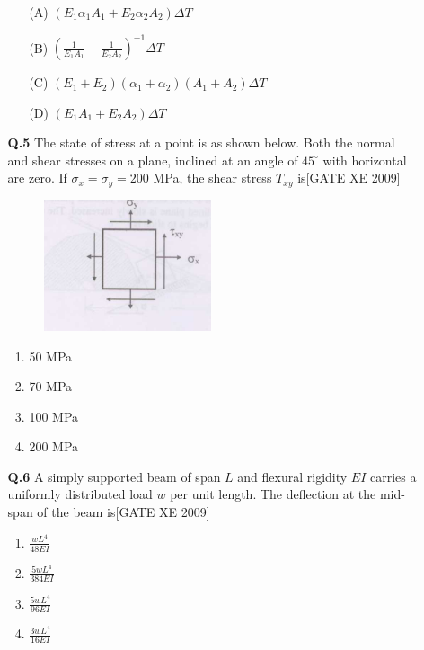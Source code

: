 \documentclass[journal,12pt,onecolumn]{IEEEtran}
\theoremstyle{remark}
\begin{document}
\begin{enumerate}
\begin{enumerate}
\begin{itemize}
    \item[(A)] $(E_1 \alpha_1 A_1 + E_2 \alpha_2 A_2) \Delta T$
    \item[(B)] $\left( \frac{1}{E_1 A_1} + \frac{1}{E_2 A_2} \right)^{-1} \Delta T$
    \item[(C)] $(E_1 + E_2)(\alpha_1 + \alpha_2)(A_1 + A_2) \Delta T$
    \item[(D)] $(E_1 A_1 + E_2 A_2) \Delta T$
\end{itemize}
\item[\textbf{Q.5}] The state of stress at a point is as shown below. Both the normal and shear stresses on a plane, inclined at an angle of $45^\circ$ with horizontal are zero. If $\sigma_x = \sigma_y = 200$ MPa, the shear stress $T_{xy}$ is\hfill[GATE XE 2009]\\
\begin{figure}[h]
    \centering
    \includegraphics[width=0.5\columnwidth]{figs/fig9.png}
\end{figure}
   

\begin{multicols}{2}
\begin{enumerate}
    \item 50 MPa
    \item 70 MPa
    \item 100 MPa
    \item 200 MPa
\end{enumerate}
\end{multicols}



\bigskip
\item[\textbf{Q.6}]  A simply supported beam of span $L$ and flexural rigidity $EI$ carries a uniformly distributed load $w$ per unit length. The deflection at the mid-span of the beam is\hfill[GATE XE 2009]\\
\begin{multicols}{2}
\begin{enumerate}
    \item $\frac{wL^4}{48EI}$
    \item $\frac{5wL^4}{384EI}$
    \item $\frac{5wL^4}{96EI}$
    \item $\frac{3wL^4}{16EI}$
\end{enumerate}
\end{multicols}


\end{enumerate}
\end{enumerate}
\end{document}
